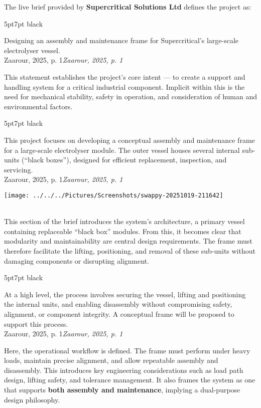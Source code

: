 \documentclass{report}
\newcommand{\formalsource}{}
\newenvironment{formal}[3][]{	\renewcommand{\formalsource}{#1}
	\def\lefty{\color{#2}\textquotedblleft}
	\def\righty{\color{#2}\textquotedblright}
	\def\FrameCommand{%
		\hspace{1pt}%
		{\color{#2}\vrule width 2pt}%
		{\color{#3}\vrule width 4pt}%
		\colorbox{#3}%
	}%
	\MakeFramed{\advance\hsize-\width\FrameRestore}%
	\begin{adjustwidth}{5pt}{7pt}%
		\vspace{4pt}%
		\ifx#2\empty\else\smash{\raisebox{-0.5em}{\huge\lefty}}\hspace{0em}\fi%
	}{%
		\hspace{0em}\smash{\raisebox{-0.5em}{\huge\righty}}\\%
		\vspace{0pt}%
		\ifx\formalsource\empty\else\hfill{\footnotesize\textit{\formalsource}}\fi%
	\end{adjustwidth}%
	\endMakeFramed%
	\noindent%
}
\begin{document}
\begin{minipage}{0.58\textwidth}
The live brief provided by \textbf{Supercritical Solutions Ltd} defines the project as:
\begin{formal}[Zaarour, 2025, p. 1]{black}{white}
	Designing an assembly and maintenance frame for Supercritical’s large-scale electrolyser vessel.
\end{formal}
This statement establishes the project’s core intent — to create a support and handling system for a critical industrial component. Implicit within this is the need for mechanical stability, safety in operation, and consideration of human and environmental factors.
\begin{formal}[Zaarour, 2025, p. 1]{black}{white}
	This project focuses on developing a conceptual assembly and maintenance frame for a large-scale electrolyser module. The outer vessel houses several internal sub-units (“black boxes”), designed for efficient replacement, inspection, and servicing.
\end{formal}
\end{minipage}\hfill
\begin{minipage}{0.4\textwidth}
    \texttt{[image: ../../../Pictures/Screenshots/swappy-20251019-211642]}
\end{minipage}\\[1em]
This section of the brief introduces the system’s architecture, a primary vessel containing replaceable “black box” modules. From this, it becomes clear that modularity and maintainability are central design requirements. The frame must therefore facilitate the lifting, positioning, and removal of these sub-units without damaging components or disrupting alignment.
\begin{formal}[Zaarour, 2025, p. 1]{black}{white}
	At a high level, the process involves securing the vessel, lifting and positioning the internal units, and enabling disassembly without compromising safety, alignment, or component integrity. A conceptual frame will be proposed to support this process.
\end{formal}
Here, the operational workflow is defined. The frame must perform under heavy loads, maintain precise alignment, and allow repeatable assembly and disassembly. This introduces key engineering considerations such as load path design, lifting safety, and tolerance management. It also frames the system as one that supports \textbf{both assembly and maintenance}, implying a dual-purpose design philosophy.
\end{document}
